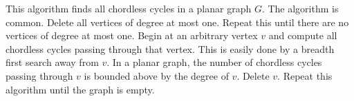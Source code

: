 This algorithm finds all chordless cycles in a planar graph $G$.
The algorithm is common.
Delete all vertices of degree at most one.
Repeat this until there are no vertices of degree at most one.
Begin at an arbitrary vertex $v$ and compute all chordless cycles passing through that vertex.
This is easily done by a breadth first search away from $v$.
In a planar graph, the number of chordless cycles passing through $v$ is bounded above by the degree of $v$.
Delete $v$.
Repeat this algorithm until the graph is empty.
